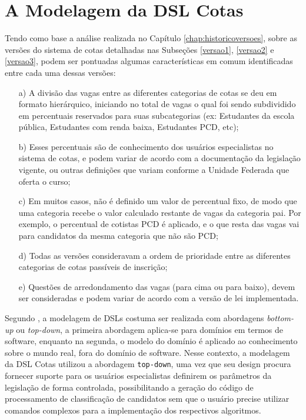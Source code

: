 \section{A Modelagem da DSL Cotas}
\label{sec:dslproposta:usuario}

   
 Tendo como base a análise realizada no Capítulo \ref{chap:historicoversoes}, sobre as versões do sistema de cotas detalhadas nas Subseções \ref{versao1}, \ref{versao2} e \ref{versao3}, podem ser  pontuadas algumas características em comum identificadas entre cada uma dessas versões:
   
   \begin{enumerate}
    \item[a)] A divisão das vagas entre as diferentes categorias de cotas se deu em formato hierárquico, iniciando no total de vagas o qual foi sendo subdividido em percentuais reservados para suas subcategorias (ex: Estudantes da escola pública, Estudantes com renda baixa, Estudantes PCD, etc); 
   
   \item[b)] Esses percentuais são de conhecimento dos usuários especialistas no sistema de cotas, e podem variar de acordo com a documentação da legislação vigente, ou outras definições que variam conforme a Unidade Federada que oferta o curso; 
   
   \item[c)] Em muitos casos, não é definido um valor de percentual fixo, de modo que uma categoria recebe o valor calculado restante de vagas da categoria pai. Por exemplo, o percentual de cotistas \gls{PCD} é aplicado, e o que resta das vagas vai para candidatos da mesma categoria que não são \gls{PCD};

   \item[d)] Todas as versões consideravam a ordem de prioridade entre as diferentes categorias de cotas passíveis de inscrição;
   
   \item[e)] Questões de arredondamento das vagas (para cima ou para baixo), devem ser consideradas e podem variar de acordo com a versão de lei implementada.

   \end{enumerate}
   
   Segundo , a modelagem de DSLs costuma ser realizada com abordagens \textit{bottom-up} ou \textit{top-down}, a primeira abordagem aplica-se para domínios em termos de software, enquanto na segunda, o modelo do domínio é aplicado ao conhecimento sobre o mundo real, fora do domínio de software. Nesse contexto, a modelagem da DSL Cotas utilizou a abordagem \texttt{top-down}, uma vez que seu design procura fornecer suporte para os usuários especialistas definirem os parâmetros da legislação de forma controlada, possibilitando a geração do código de processamento de classificação de candidatos sem que o usuário precise utilizar comandos complexos para a implementação dos respectivos algoritmos.
   
